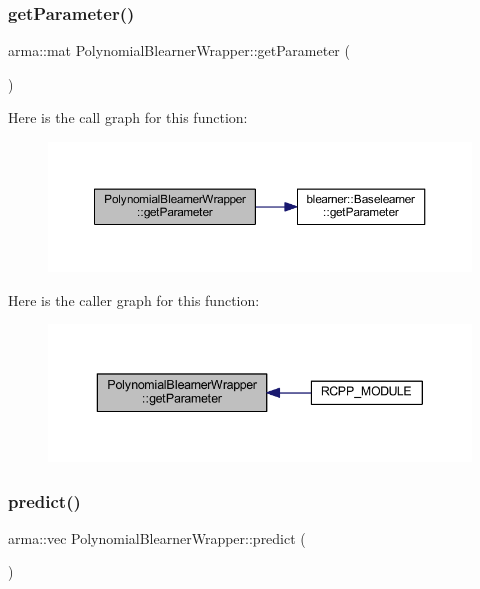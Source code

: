 \subsubsection{\texorpdfstring{get\+Parameter()}{getParameter()}}
{\footnotesize\ttfamily arma\+::mat Polynomial\+Blearner\+Wrapper\+::get\+Parameter (\begin{DoxyParamCaption}{ }\end{DoxyParamCaption})\hspace{0.3cm}{\ttfamily [inline]}}

Here is the call graph for this function\+:\nopagebreak
\begin{figure}[H]
\begin{center}
\leavevmode
\includegraphics[width=350pt]{class_polynomial_blearner_wrapper_a40ee4c7ab2c7230d96577d3a588b262f_cgraph}
\end{center}
\end{figure}
Here is the caller graph for this function\+:\nopagebreak
\begin{figure}[H]
\begin{center}
\leavevmode
\includegraphics[width=343pt]{class_polynomial_blearner_wrapper_a40ee4c7ab2c7230d96577d3a588b262f_icgraph}
\end{center}
\end{figure}
\mbox{\label{class_polynomial_blearner_wrapper_a24469ccf334749669dc1ee809263dfb2}} 
\subsubsection{\texorpdfstring{predict()}{predict()}}
{\footnotesize\ttfamily arma\+::vec Polynomial\+Blearner\+Wrapper\+::predict (\begin{DoxyParamCaption}{ }\end{DoxyParamCaption})\hspace{0.3cm}{\ttfamily [inline]}}

